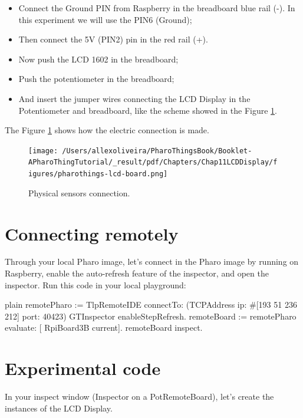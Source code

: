 \documentclass[10pt,twoside,english]{_support/latex/sbabook/sbabook}
\begin{document}
\begin{itemize}
\item Connect the Ground PIN from Raspberry in the breadboard blue rail (-). In this experiment we will use the PIN6 (Ground);
\item Then connect the 5V (PIN2) pin in the red rail (+). 
\item Now push the LCD 1602 in the breadboard;
\item Push the potentiometer in the breadboard;
\item And insert the jumper wires connecting the LCD Display in the Potentiometer and breadboard, like the scheme showed in the Figure \ref{physicalLCD}.
\end{itemize}

The Figure \ref{physicalLCD} shows how the electric connection is made.


\begin{figure}

\begin{center}
\texttt{[image: /Users/allexoliveira/PharoThingsBook/Booklet-APharoThingTutorial/\_result/pdf/Chapters/Chap11LCDDisplay/figures/pharothings-lcd-board.png]}\caption{Physical sensors connection.\label{physicalLCD}}\end{center}
\end{figure}

\section{Connecting remotely}
Through your local Pharo image, let’s connect in the Pharo image by running on Raspberry, enable the auto-refresh feature of the inspector, and open the inspector.
Run this code in your local playground:

\begin{displaycode}{plain}
remotePharo := TlpRemoteIDE connectTo: (TCPAddress ip: #[193 51 236 212] port: 40423)
GTInspector enableStepRefresh.
remoteBoard := remotePharo evaluate: [ RpiBoard3B current].
remoteBoard inspect.
\end{displaycode}
\section{Experimental code}
In your inspect window (Inspector on a PotRemoteBoard), let’s create the instances of the LCD Display. 


\backmatter

\end{document}
